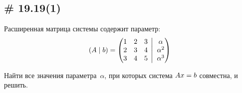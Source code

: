 \documentclass[a4paper,12pt]{article}
\newcommand{\BigMiddleThree}{\;\left|\vphantom{\begin{pmatrix} 0\\0\\0 \end{pmatrix}}\right.\;}
\begin{document}
  \subsection{\# 19.19(1)}
  
  Расширенная матрица системы содержит параметр:
  \[
    (A \mid b) = \left(
      \begin{matrix}
        1 & 2 & 3\\
        2 & 3 & 4\\
        3 & 4 & 5
      \end{matrix}
      \BigMiddleThree
      \begin{matrix}
        \alpha\\
        \alpha^2\\
        \alpha^3
      \end{matrix}
    \right)
  \]

  Найти все значения параметра~$\alpha$, при которых система $Ax \hm= b$ совместна, и решить.
  
\end{document}
